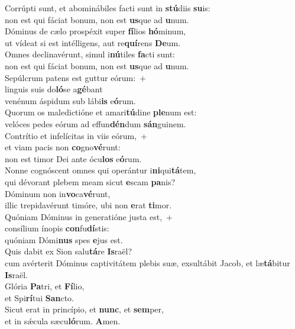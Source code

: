 \evenverse Corrúpti sunt, et abominábiles facti sunt in \textbf{stú}diis \textbf{su}is:~\*\\
\evenverse non est qui fáciat bonum, non est \textbf{us}que ad \textbf{u}num.\\
\oddverse Dóminus de cælo prospéxit super \textbf{fí}lios \textbf{hó}minum,~\*\\
\oddverse ut vídeat si est intélligens, aut re\textbf{quí}rens \textbf{De}um.\\
\evenverse Omnes declinavérunt, simul i\textbf{nú}tiles \textbf{fa}cti sunt:~\*\\
\evenverse non est qui fáciat bonum, non est \textbf{us}que ad \textbf{u}num.\\
\oddverse Sepúlcrum patens est guttur eórum:~+\\
\oddverse  linguis suis do\textbf{ló}se a\textbf{gé}bant~\*\\
\oddverse venénum áspidum sub lábi\textbf{is} e\textbf{ó}rum.\\
\evenverse Quorum os maledictióne et amari\textbf{tú}dine \textbf{ple}num est:~\*\\
\evenverse velóces pedes eórum ad effun\textbf{dén}dum \textbf{sán}guinem.\\
\oddverse Contrítio et infelícitas in viis eórum,~+\\
\oddverse  et viam pacis non \textbf{co}gno\textbf{vé}runt:~\*\\
\oddverse non est timor Dei ante ócu\textbf{los} e\textbf{ó}rum.\\
\evenverse Nonne cognóscent omnes qui operántur i\textbf{ni}qui\textbf{tá}tem,~\*\\
\evenverse qui dévorant plebem meam sicut \textbf{e}scam \textbf{pa}nis?\\
\oddverse Dóminum non in\textbf{vo}ca\textbf{vé}runt,~\*\\
\oddverse illic trepidavérunt timóre, ubi non \textbf{e}rat \textbf{ti}mor.\\
\evenverse Quóniam Dóminus in generatióne justa est,~+\\
\evenverse  consílium ínopis \textbf{con}fu\textbf{dí}stis:~\*\\
\evenverse quóniam Dómi\textbf{nus} spes \textbf{e}jus est.\\
\oddverse Quis dabit ex Sion salu\textbf{tá}re \textbf{Is}raël?~\*\\
\oddverse cum avérterit Dóminus captivitátem plebis suæ, exsultábit Jacob, et læ\textbf{tá}bitur \textbf{Is}raël.\\
\evenverse Glória \textbf{Pa}tri, et \textbf{Fí}lio,~\*\\
\evenverse et Spi\textbf{rí}tui \textbf{San}cto.\\
\oddverse Sicut erat in princípio, et \textbf{nunc}, et \textbf{sem}per,~\*\\
\oddverse et in sǽcula sæcu\textbf{ló}rum. \textbf{A}men.\\
